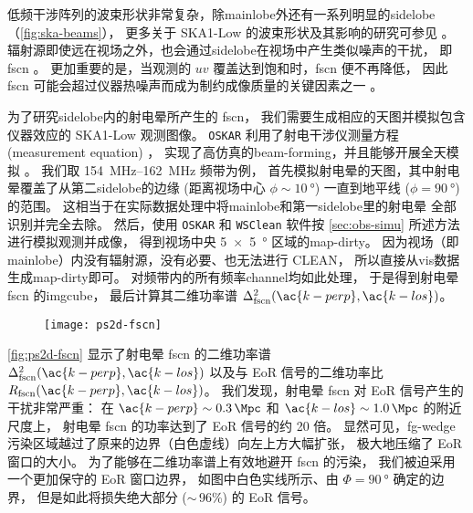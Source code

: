 低频干涉阵列的波束形状非常复杂，除\ac{mainlobe}外还有一系列明显的\ac{sidelobe}
\cite{noordam2004,wijnholds2010}（\autoref{fig:ska-beams}），
更多关于 SKA1-Low 的波束形状及其影响的研究可参见 。
辐射源即使远在视场之外，也会通过\ac{sidelobe}在视场中产生类似噪声的干扰，
即\acf{fscn} \cite{smirnov2012}。
更加重要的是，当观测的 $uv$ 覆盖达到饱和时，\ac{fscn} 便不再降低，
因此 \ac{fscn} 可能会超过仪器热噪声而成为制约成像质量的关键因素之一 \cite{mort2017}。

为了研究\ac{sidelobe}内的射电晕所产生的 \ac{fscn}，
我们需要生成相应的天图并模拟包含仪器效应的 SKA1-Low 观测图像。
\texttt{OSKAR} 利用了射电干涉仪测量方程 (measurement equation) \cite{smirnov2011}，
实现了高仿真的\ac{beam-forming}，并且能够开展全天模拟 \cite{mort2010}。
我们取 \SIrange{154}{162}{\MHz} 频带为例，
首先模拟射电晕的天图，其中射电晕覆盖了从第二\ac{sidelobe}的边缘
(距离视场中心 $\phi \sim \SI{10}{\degree}$)
一直到地平线 ($\phi = \SI{90}{\degree}$) 的范围。
这相当于在实际数据处理中将\ac{mainlobe}和第一\ac{sidelobe}里的射电晕
全部识别并完全去除。
然后，使用 \texttt{OSKAR} 和 \texttt{WSClean} 软件按
\autoref{sec:obs-simu} 所述方法进行模拟观测并成像，
得到视场中央 \SI{5 x 5}{\degree} 区域的\ac{map-dirty}。
因为视场（即\ac{mainlobe}）内没有辐射源，没有必要、也无法进行 CLEAN，
所以直接从\ac{vis}数据生成\ac{map-dirty}即可。
对频带内的所有频率\ac{channel}均如此处理，
于是得到射电晕 \ac{fscn} 的\ac{imgcube}，
最后计算其二维功率谱 $\Delta^2_{\R{fscn}}(\ac{k-perp}, \ac{k-los})$。

\begin{figure}[htp]
  \centering
  \texttt{[image: ps2d-fscn]}
  \label{fig:ps2d-fscn}
\end{figure}

\autoref{fig:ps2d-fscn} 显示了射电晕 \ac{fscn}
的二维功率谱 $\Delta^2_{\R{fscn}}(\ac{k-perp}, \ac{k-los})$
以及与 EoR 信号的二维功率比 $R_{\R{fscn}}(\ac{k-perp}, \ac{k-los})$。
我们发现，射电晕 \ac{fscn} 对 EoR 信号产生的干扰非常严重：
在 $\ac{k-perp} \sim \SI{0.3}{\per\Mpc}$
和 $\ac{k-los} \sim \SI{1.0}{\per\Mpc}$ 的附近尺度上，
射电晕 \ac{fscn} 的功率达到了 EoR 信号的约 20 倍。
显然可见，\ac{fg-wedge}污染区域越过了原来的边界（白色虚线）向左上方大幅扩张，
极大地压缩了 EoR 窗口的大小。
为了能够在二维功率谱上有效地避开 \ac{fscn} 的污染，
我们被迫采用一个更加保守的 EoR 窗口边界，
如图中白色实线所示、由 $\Phi = \SI{90}{\degree}$ 确定的边界，
但是如此将损失绝大部分 ($\sim$\,96\%) 的 EoR 信号。

